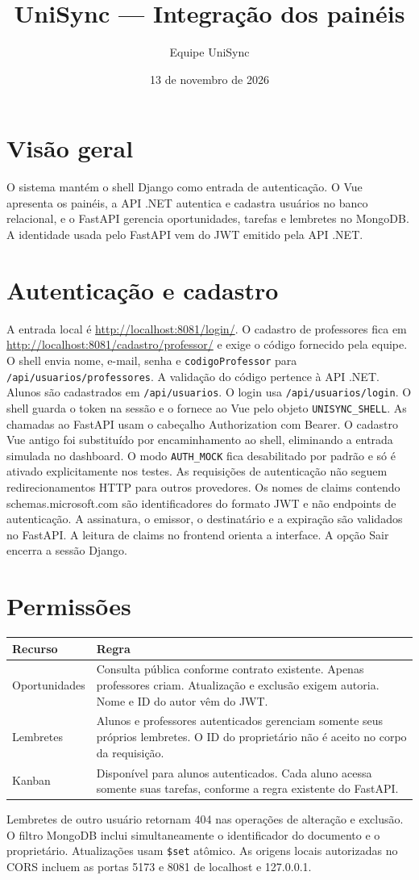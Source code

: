\documentclass[11pt,a4paper]{article}
\title{UniSync --- Integração dos painéis}
\author{Equipe UniSync}
\date{13 de novembro de 2026}
\begin{document}
\maketitle
\tableofcontents
\section{Visão geral}
O sistema mantém o shell Django como entrada de autenticação. O Vue apresenta os painéis, a API .NET autentica e cadastra usuários no banco relacional, e o FastAPI gerencia oportunidades, tarefas e lembretes no MongoDB.
A identidade usada pelo FastAPI vem do JWT emitido pela API .NET.

\section{Autenticação e cadastro}
A entrada local é \url{http://localhost:8081/login/}.
O cadastro de professores fica em \url{http://localhost:8081/cadastro/professor/} e exige o código fornecido pela equipe.
O shell envia nome, e-mail, senha e \texttt{codigoProfessor} para \texttt{/api/usuarios/professores}. A validação do código pertence à API .NET.
Alunos são cadastrados em \texttt{/api/usuarios}. O login usa \texttt{/api/usuarios/login}.
O shell guarda o token na sessão e o fornece ao Vue pelo objeto \texttt{UNISYNC\_SHELL}. As chamadas ao FastAPI usam o cabeçalho Authorization com Bearer.
O cadastro Vue antigo foi substituído por encaminhamento ao shell, eliminando a entrada simulada no dashboard.
O modo \texttt{AUTH\_MOCK} fica desabilitado por padrão e só é ativado explicitamente nos testes.
As requisições de autenticação não seguem redirecionamentos HTTP para outros provedores.
Os nomes de claims contendo schemas.microsoft.com são identificadores do formato JWT e não endpoints de autenticação.
A assinatura, o emissor, o destinatário e a expiração são validados no FastAPI. A leitura de claims no frontend orienta a interface.
A opção Sair encerra a sessão Django.

\section{Permissões}
\begin{longtable}{p{4cm}p{10cm}}
Recurso & Regra \\ \hline
Oportunidades & Consulta pública conforme contrato existente. Apenas professores criam. Atualização e exclusão exigem autoria. Nome e ID do autor vêm do JWT. \\
Lembretes & Alunos e professores autenticados gerenciam somente seus próprios lembretes. O ID do proprietário não é aceito no corpo da requisição. \\
Kanban & Disponível para alunos autenticados. Cada aluno acessa somente suas tarefas, conforme a regra existente do FastAPI. \\
\end{longtable}
Lembretes de outro usuário retornam 404 nas operações de alteração e exclusão. O filtro MongoDB inclui simultaneamente o identificador do documento e o proprietário. Atualizações usam \texttt{\$set} atômico.
As origens locais autorizadas no CORS incluem as portas 5173 e 8081 de localhost e 127.0.0.1.
\end{document}
